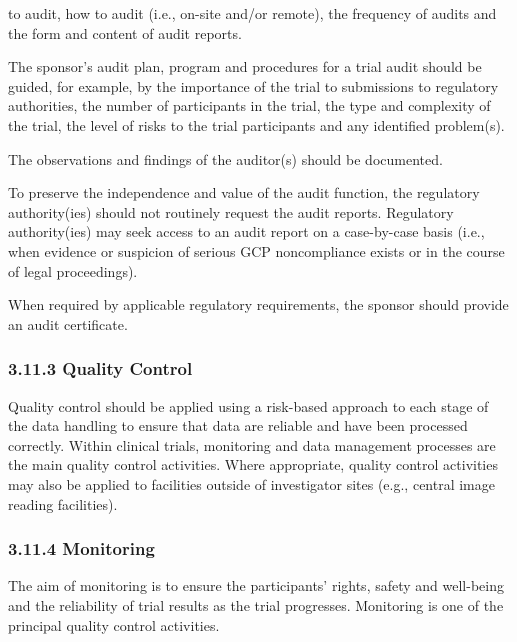\documentclass[11pt]{article}
\begin{document}
to audit, how to audit (i.e., on-site and/or remote), the frequency of audits and the form and content of audit reports.


\begin{description}[leftmargin=2.5cm,style=sameline]

\item[(b)] The sponsor's audit plan, program and procedures for a trial audit should be guided, for example, by the importance of the trial to submissions to regulatory authorities, the number of participants in the trial, the type and complexity of the trial, the level of risks to the trial participants and any identified problem(s).

\item[(c)] The observations and findings of the auditor(s) should be documented.

\item[(d)] To preserve the independence and value of the audit function, the regulatory authority(ies) should not routinely request the audit reports. Regulatory authority(ies) may seek access to an audit report on a case-by-case basis (i.e., when evidence or suspicion of serious GCP noncompliance exists or in the course of legal proceedings).

\item[(e)] When required by applicable regulatory requirements, the sponsor should provide an audit certificate.

\end{description}

\subsubsection{3.11.3 Quality Control}

Quality control should be applied using a risk-based approach to each stage of the data handling to ensure that data are reliable and have been processed correctly. Within clinical trials, monitoring and data management processes are the main quality control activities. Where appropriate, quality control activities may also be applied to facilities outside of investigator sites (e.g., central image reading facilities).


\subsubsection{3.11.4 Monitoring}

The aim of monitoring is to ensure the participants' rights, safety and well-being and the reliability of trial results as the trial progresses. Monitoring is one of the principal quality control activities.
\end{document}

